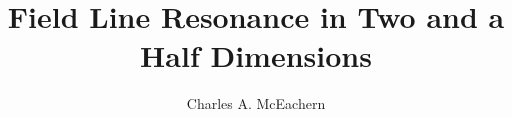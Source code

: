 

\phd %

%
\title{\bf Field Line Resonance in Two and a Half Dimensions}
\author{Charles A. McEachern}


\abstract{}

\copyrightpageccbysa %

\acknowledgements{}
\dedication{}


\beforepreface

\figurespage
\tablespage

\afterpreface
